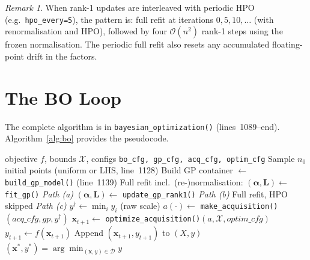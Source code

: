 \documentclass[11pt,a4paper]{article}
\newcommand{\bx}{\bm{x}}
\newcommand{\bL}{\bm{L}}
\newcommand{\balpha}{\bm{\alpha}}
\theoremstyle{remark}
\newtheorem{remark}{Remark}
\newcommand{\codeline}[1]{line~#1}
\newcommand{\coderange}[2]{lines~#1--#2}
\newcommand{\codefn}[1]{\texttt{#1()}}
\begin{document}
\begin{remark}
When rank-1 updates are interleaved with periodic HPO (e.g.\
\texttt{hpo\_every=5}), the pattern is: full refit at iterations
$0, 5, 10, \ldots$ (with renormalisation and HPO), followed by four
$\mathcal{O}(n^2)$ rank-1 steps using the frozen normalisation.  The periodic
full refit also resets any accumulated floating-point drift in the factors.
\end{remark}

\section{The BO Loop}
\label{sec:bo_loop}

The complete algorithm is in \codefn{bayesian\_optimization}
(\coderange{1089}{end}).  Algorithm~\ref{alg:bo} provides the pseudocode.

\begin{algorithm}[ht]
\caption{Bayesian Optimisation --- \codefn{bayesian\_optimization}}
\label{alg:bo}
\begin{algorithmic}[1]
\Require objective $f$, bounds $\mathcal{X}$, configs
  \texttt{bo\_cfg, gp\_cfg, acq\_cfg, optim\_cfg}
\State Sample $n_0$ initial points (uniform or LHS, \codeline{1128})
\State Build GP container $\leftarrow$ \codefn{build\_gp\_model} (\codeline{1139})
\For{$t = 0, 1, \ldots, T-1$}
    \State Full refit incl.\ (re-)normalisation: $(\balpha, \bL) \leftarrow$ \codefn{fit\_gp}
           \hfill \textit{Path (a)}
    \State $(\balpha, \bL) \leftarrow$ \codefn{update\_gp\_rank1}
           \hfill \textit{Path (b)}
  \Else
    \State Full refit, HPO skipped
           \hfill \textit{Path (c)}
  \EndIf
  \State $y^\dagger \leftarrow \min_i y_i$ \quad (raw scale)
  \State $a(\cdot) \leftarrow$ \codefn{make\_acquisition}$(acq\_cfg, gp, y^\dagger)$
  \State $\bx_{t+1} \leftarrow$ \codefn{optimize\_acquisition}$(a, \mathcal{X}, optim\_cfg)$
  \State $y_{t+1} \leftarrow f(\bx_{t+1})$
  \State Append $(\bx_{t+1}, y_{t+1})$ to $(X, y)$
\EndFor
\State \Return $(\bx^*, y^*) = \arg\min_{(\bx,y)\in\mathcal{D}} y$
\end{algorithmic}
\end{algorithm}
\end{document}
